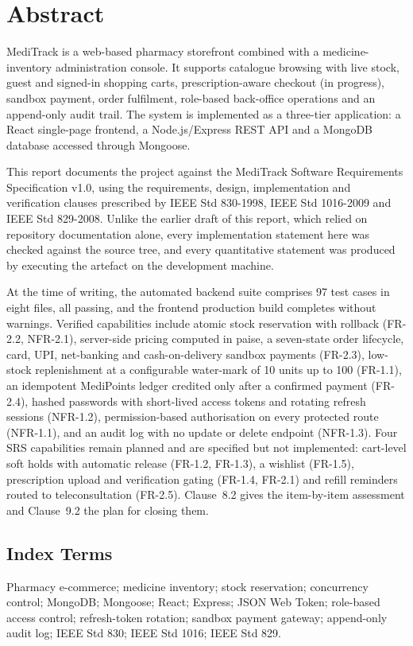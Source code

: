\documentclass[11pt,a4paper]{article}
\begin{document}
\section*{Abstract}

MediTrack is a web-based pharmacy storefront combined with a medicine-inventory
administration console. It supports catalogue browsing with live stock, guest and
signed-in shopping carts, prescription-aware checkout (in progress), sandbox payment,
order fulfilment, role-based back-office operations and an append-only audit trail. The
system is implemented as a three-tier application: a React single-page frontend, a
Node.js/Express REST API and a MongoDB database accessed through Mongoose.

This report documents the project against the MediTrack Software Requirements
Specification v1.0, using the requirements, design, implementation and verification
clauses prescribed by IEEE Std 830-1998, IEEE Std 1016-2009 and IEEE Std 829-2008.
Unlike the earlier draft of this report, which relied on repository documentation
alone, every implementation statement here was checked against the source tree, and
every quantitative statement was produced by executing the artefact on the development
machine.

At the time of writing, the automated backend suite comprises 97 test cases in eight
files, all passing, and the frontend production build completes without warnings.
Verified capabilities include atomic stock reservation with rollback (FR-2.2, NFR-2.1),
server-side pricing computed in paise, a seven-state order lifecycle, card, UPI,
net-banking and cash-on-delivery sandbox payments (FR-2.3), low-stock replenishment at
a configurable water-mark of 10 units up to 100 (FR-1.1), an idempotent MediPoints
ledger credited only after a confirmed payment (FR-2.4), hashed passwords with
short-lived access tokens and rotating refresh sessions (NFR-1.2), permission-based
authorisation on every protected route (NFR-1.1), and an audit log with no update or
delete endpoint (NFR-1.3). Four SRS capabilities remain planned and are specified but
not implemented: cart-level soft holds with automatic release (FR-1.2, FR-1.3), a
wishlist (FR-1.5), prescription upload and verification gating (FR-1.4, FR-2.1) and
refill reminders routed to teleconsultation (FR-2.5). Clause~8.2 gives the
item-by-item assessment and Clause~9.2 the plan for closing them.

\subsection*{Index Terms}
Pharmacy e-commerce; medicine inventory; stock reservation; concurrency control;
MongoDB; Mongoose; React; Express; JSON Web Token; role-based access control;
refresh-token rotation; sandbox payment gateway; append-only audit log; IEEE Std 830;
IEEE Std 1016; IEEE Std 829.
\end{document}
